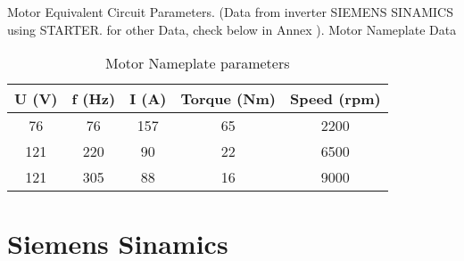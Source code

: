 Motor Equivalent Circuit Parameters. (Data from inverter SIEMENS SINAMICS using STARTER. for other Data, check below in Annex ).
Motor Nameplate Data

\begin{table}
	\centering
	\begin{tabular}{ccccc}
		\toprule
		\textbf{U (V)} & \textbf{f (Hz)} & \textbf{I (A)} & \textbf{Torque (Nm)} & \textbf{Speed (rpm)} \\
		\midrule
		76 & 76 & 157 & 65 & 2200 \\
		121 & 220 & 90 & 22 & 6500 \\
		121 & 305 & 88 & 16 & 9000 \\
		\bottomrule
	\end{tabular}
	\caption{Motor Nameplate parameters}
\label{tab:motor_nameplate_data}
\end{table}



\section{Siemens Sinamics}

\blindtext

